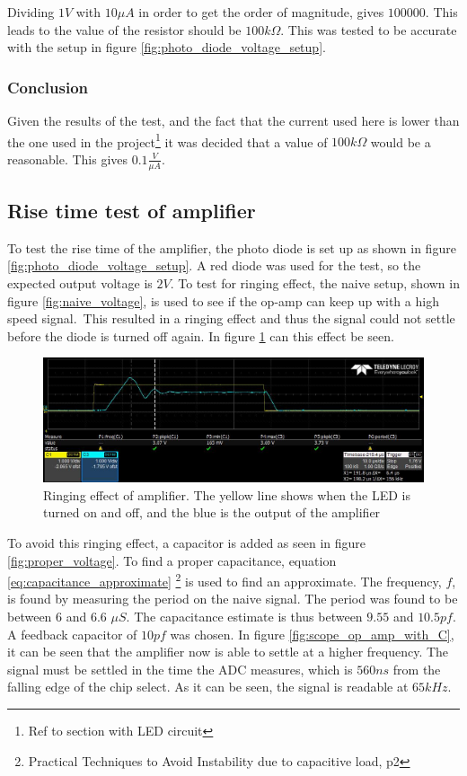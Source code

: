Dividing $1 V$ with $10 \mu A$ in order to get the order of magnitude, gives $100 000$. This leads to the value of the resistor should be $100 k\Omega$.
This was tested to be accurate with the setup in figure \ref{fig:photo_diode_voltage_setup}.


\subsubsection{Conclusion}
Given the results of the test, and the fact that the current used here is lower than the one used in the project\footnote{Ref to section with LED circuit} it was decided that a value of $100 k\Omega$ would be a reasonable. This gives $0.1 \frac{V}{\mu A}$.

\subsection{Rise time test of amplifier} \label{sec:rise_time_test}

To test the rise time of the amplifier, the photo diode is set up as shown in figure \ref{fig:photo_diode_voltage_setup}.
A red diode was used for the test, so the expected output voltage is $2 V$.
To test for ringing effect, the naive setup, shown in figure \ref{fig:naive_voltage}, 
is used to see if the op-amp can keep up with a high speed signal.\
This resulted in a ringing effect and thus the signal could not settle before the diode is turned off again.
In figure \ref{fig:scope_op_amp_no_C} can this effect be seen.

\begin{figure}[ht]
\includegraphics[width=\linewidth]{img/amp_test_ringing2.jpg}
\caption{Ringing effect of amplifier. The yellow line shows when the LED is turned on and off, and the blue is the output of the amplifier}
\label{fig:scope_op_amp_no_C}
\end{figure}

To avoid this ringing effect, a capacitor is added as seen in figure \ref{fig:proper_voltage}.
To find a proper capacitance, equation \ref{eq:capacitance_approximate}
\footnote{Practical Techniques to Avoid Instability due to capacitive load, p2}
is used to find an approximate.
The frequency, $f$, is found by measuring the period on the naive signal.
The period was found to be between $6$ and $6.6$ $\mu S$.
The capacitance estimate is thus between $9.55$ and $10.5 pf$. 
A feedback capacitor of $10 pf$ was chosen.
In figure \ref{fig:scope_op_amp_with_C}, it can be seen that the amplifier now is able to settle at a higher frequency.
The signal must be settled in the time the ADC measures, which is $560 ns$ from the falling edge of the chip select.
As it can be seen, the signal is readable at $65 kHz$.

